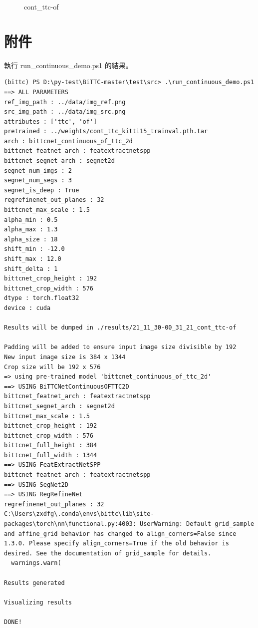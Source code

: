 \documentclass[10pt,UTF8]{ctexart}
\begin{document}
\begin{figure}[H]
\centering  %
\caption{cont\_ttc-of}
\label{Fig.main}
\end{figure}

\newpage

\section{附件}

執行 run\_continuous\_demo.ps1 的結果。

\begin{verbatim}
(bittc) PS D:\py-test\BiTTC-master\test\src> .\run_continuous_demo.ps1
==> ALL PARAMETERS
ref_img_path : ../data/img_ref.png
src_img_path : ../data/img_src.png
attributes : ['ttc', 'of']
pretrained : ../weights/cont_ttc_kitti15_trainval.pth.tar
arch : bittcnet_continuous_of_ttc_2d
bittcnet_featnet_arch : featextractnetspp
bittcnet_segnet_arch : segnet2d
segnet_num_imgs : 2
segnet_num_segs : 3
segnet_is_deep : True
regrefinenet_out_planes : 32
bittcnet_max_scale : 1.5
alpha_min : 0.5
alpha_max : 1.3
alpha_size : 18
shift_min : -12.0
shift_max : 12.0
shift_delta : 1
bittcnet_crop_height : 192
bittcnet_crop_width : 576
dtype : torch.float32
device : cuda

Results will be dumped in ./results/21_11_30-00_31_21_cont_ttc-of

Padding will be added to ensure input image size divisible by 192
New input image size is 384 x 1344
Crop size will be 192 x 576
=> using pre-trained model 'bittcnet_continuous_of_ttc_2d'
==> USING BiTTCNetContinuousOFTTC2D
bittcnet_featnet_arch : featextractnetspp
bittcnet_segnet_arch : segnet2d
bittcnet_max_scale : 1.5
bittcnet_crop_height : 192
bittcnet_crop_width : 576
bittcnet_full_height : 384
bittcnet_full_width : 1344
==> USING FeatExtractNetSPP
bittcnet_featnet_arch : featextractnetspp
==> USING SegNet2D
==> USING RegRefineNet
regrefinenet_out_planes : 32
C:\Users\zxdfg\.conda\envs\bittc\lib\site-packages\torch\nn\functional.py:4003: UserWarning: Default grid_sample and affine_grid behavior has changed to align_corners=False since 1.3.0. Please specify align_corners=True if the old behavior is desired. See the documentation of grid_sample for details.
  warnings.warn(

Results generated

Visualizing results

DONE!
\end{verbatim}
\end{document}
